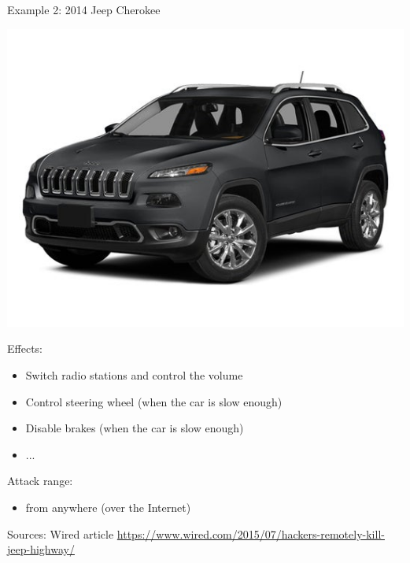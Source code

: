 \begin{frame}{Example 2: 2014 Jeep Cherokee~\cite{miller2015remote}}
    \begin{center}
        \includegraphics[scale=0.2]{Figures/jeep_cherokee.jpg}
    \end{center}
    \vspace{-5mm}
    
    Effects:
    \begin{itemize}
        \item Switch radio stations and control the volume
        \item Control steering wheel (when the car is slow enough)
        \item Disable brakes (when the car is slow enough)
        \item ...
    \end{itemize}
    
    Attack range:
    \begin{itemize}
        \item from anywhere (over the Internet)
    \end{itemize}
    
    \medskip
    \tiny{Sources: Wired article  \url{https://www.wired.com/2015/07/hackers-remotely-kill-jeep-highway/}}
\end{frame}

